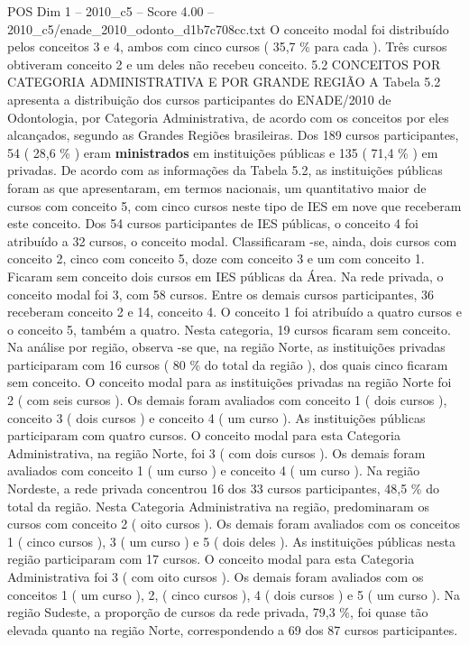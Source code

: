 \begin{textsample}{POS Dim 1 – 2010\_c5 – Score 4.00 – 2010\_c5/enade\_2010\_odonto\_d1b7c708cc.txt}
O conceito modal foi distribuído pelos conceitos 3 e 4, ambos com cinco cursos ( 35,7 \% para cada ).
Três cursos obtiveram conceito 2 e um deles não recebeu conceito. 5.2 CONCEITOS POR CATEGORIA ADMINISTRATIVA E POR GRANDE REGIÃO A Tabela 5.2 apresenta a distribuição dos cursos participantes do ENADE/2010 de Odontologia, por Categoria Administrativa, de acordo com os conceitos por eles alcançados, segundo as Grandes Regiões brasileiras.
Dos 189 cursos participantes, 54 ( 28,6 \% ) eram \textbf{ministrados} em instituições públicas e 135 ( 71,4 \% ) em privadas.
De acordo com as informações da Tabela 5.2, as instituições públicas foram as que apresentaram, em termos nacionais, um quantitativo maior de cursos com conceito 5, com cinco cursos neste tipo de IES em nove que receberam este conceito.
Dos 54 cursos participantes de IES públicas, o conceito 4 foi atribuído a 32 cursos, o conceito modal.
Classificaram -se, ainda, dois cursos com conceito 2, cinco com conceito 5, doze com conceito 3 e um com conceito 1.
Ficaram sem conceito dois cursos em IES públicas da Área.
Na rede privada, o conceito modal foi 3, com 58 cursos.
Entre os demais cursos participantes, 36 receberam conceito 2 e 14, conceito 4.
O conceito 1 foi atribuído a quatro cursos e o conceito 5, também a quatro.
Nesta categoria, 19 cursos ficaram sem conceito.
Na análise por região, observa -se que, na região Norte, as instituições privadas participaram com 16 cursos ( 80 \% do total da região ), dos quais cinco ficaram sem conceito.
O conceito modal para as instituições privadas na região Norte foi 2 ( com seis cursos ).
Os demais foram avaliados com conceito 1 ( dois cursos ), conceito 3 ( dois cursos ) e conceito 4 ( um curso ).
As instituições públicas participaram com quatro cursos.
O conceito modal para esta Categoria Administrativa, na região Norte, foi 3 ( com dois cursos ).
Os demais foram avaliados com conceito 1 ( um curso ) e conceito 4 ( um curso ).
Na região Nordeste, a rede privada concentrou 16 dos 33 cursos participantes, 48,5 \% do total da região.
Nesta Categoria Administrativa na região, predominaram os cursos com conceito 2 ( oito cursos ).
Os demais foram avaliados com os conceitos 1 ( cinco cursos ), 3 ( um curso ) e 5 ( dois deles ).
As instituições públicas nesta região participaram com 17 cursos.
O conceito modal para esta Categoria Administrativa foi 3 ( com oito cursos ).
Os demais foram avaliados com os conceitos 1 ( um curso ), 2, ( cinco cursos ), 4 ( dois cursos ) e 5 ( um curso ).
Na região Sudeste, a proporção de cursos da rede privada, 79,3 \%, foi quase tão elevada quanto na região Norte, correspondendo a 69 dos 87 cursos participantes.

\end{textsample}
